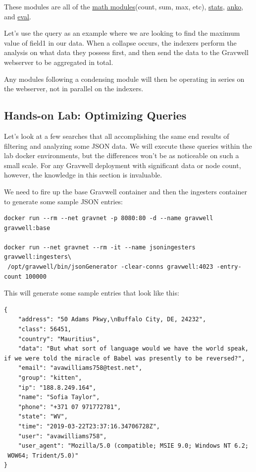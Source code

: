 These modules are all of the \href{https://docs.gravwell.io/#!search/math/math.md}{math
modules}(count, sum, max, etc),
\href{https://docs.gravwell.io/#!search/stats/stats.md}{stats},
\href{https://docs.gravwell.io/#!search/anko/anko.md}{anko}, and
\href{https://docs.gravwell.io/#!search/eval/eval.md}{eval}.

Let's use the query  as an
example where we are looking to find the maximum value of field1 in our
data. When a collapse occurs, the indexers perform the analysis on what
data they possess first, and then send the data to the Gravwell
webserver to be aggregated in total.

Any modules following a condensing module will then be operating in
series on the webserver, not in parallel on the indexers.

\subsection{Hands-on Lab: Optimizing Queries}

Let's look at a few searches that all accomplishing the same end
results of filtering and analyzing some JSON data. We will execute these
queries within the lab docker environments, but the differences won't be
as noticeable on such a small scale. For any Gravwell deployment with
significant data or node count, however, the knowledge in this section
is invaluable.

We need to fire up the base Gravwell container and then the ingesters
container to generate some sample JSON entries:

\begin{Verbatim}[breaklines=true]
docker run --rm --net gravnet -p 8080:80 -d --name gravwell gravwell:base

docker run --net gravnet --rm -it --name jsoningesters gravwell:ingesters\
 /opt/gravwell/bin/jsonGenerator -clear-conns gravwell:4023 -entry-count 100000
\end{Verbatim}

This will generate some sample entries that look like this:

\begin{Verbatim}[breaklines=true]
{
    "address": "50 Adams Pkwy,\nBuffalo City, DE, 24232",
    "class": 56451,
    "country": "Mauritius",
    "data": "But what sort of language would we have the world speak, 
if we were told the miracle of Babel was presently to be reversed?",
    "email": "avawilliams758@test.net",
    "group": "kitten",
    "ip": "188.8.249.164",
    "name": "Sofia Taylor",
    "phone": "+371 07 971772781",
    "state": "WV",
    "time": "2019-03-22T23:37:16.34706728Z",
    "user": "avawilliams758",
    "user_agent": "Mozilla/5.0 (compatible; MSIE 9.0; Windows NT 6.2;
 WOW64; Trident/5.0)"
}
\end{Verbatim}

